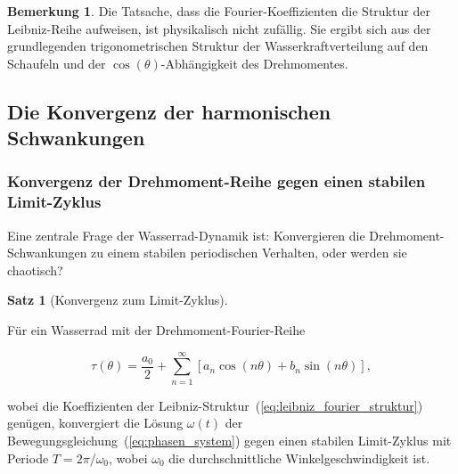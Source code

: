 \documentclass[a4paper,12pt]{article}
\theoremstyle{definition}
\newtheorem{satz}{Satz}
\newtheorem{bemerkung}{Bemerkung}
\begin{document}
\begin{bemerkung}
  Die Tatsache, dass die Fourier-Koeffizienten die Struktur der Leibniz-Reihe aufweisen, ist physikalisch nicht zufällig. Sie ergibt sich aus der grundlegenden trigonometrischen Struktur der Wasserkraftverteilung auf den Schaufeln und der $\cos(\theta)$-Abhängigkeit des Drehmomentes.
\end{bemerkung}

\subsection{Die Konvergenz der harmonischen Schwankungen}

\subsubsection{Konvergenz der Drehmoment-Reihe gegen einen stabilen Limit-Zyklus}

Eine zentrale Frage der Wasserrad-Dynamik ist: Konvergieren die Drehmoment-Schwankungen zu einem stabilen periodischen Verhalten, oder werden sie chaotisch?

\begin{satz}[Konvergenz zum Limit-Zyklus]
  \label{satz:limit_zyklus}
  
  Für ein Wasserrad mit der Drehmoment-Fourier-Reihe
  
  \begin{equation}
    \tau(\theta) = \frac{a_0}{2} + \sum_{n=1}^{\infty} \left[ a_n \cos(n\theta) + b_n \sin(n\theta) \right],
  \end{equation}
  
  wobei die Koeffizienten der Leibniz-Struktur~(\ref{eq:leibniz_fourier_struktur}) genügen, konvergiert die Lösung $\omega(t)$ der Bewegungsgleichung~(\ref{eq:phasen_system}) gegen einen stabilen Limit-Zyklus mit Periode $T = 2\pi/\omega_0$, wobei $\omega_0$ die durchschnittliche Winkelgeschwindigkeit ist.
\end{satz}
\end{document}
